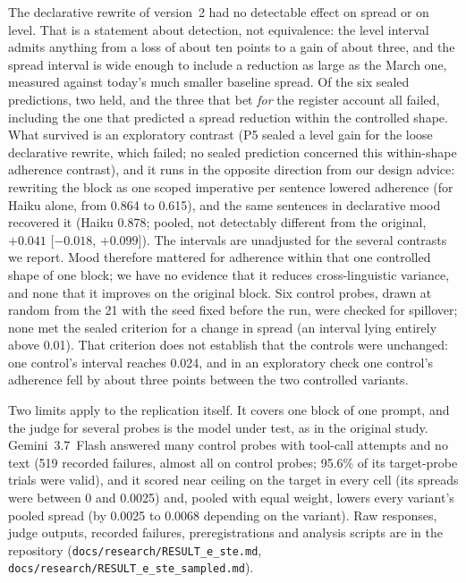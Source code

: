 \documentclass[11pt,a4paper]{article}
\begin{document}
The declarative rewrite of version~2 had no detectable effect on
spread or on level. That is a statement about detection, not
equivalence: the level interval admits anything from a loss of about
ten points to a gain of about three, and the spread interval is wide
enough to include a reduction as large as the March one, measured
against today's much smaller baseline spread. Of the six sealed
predictions, two held, and the three that bet \emph{for} the register
account all failed, including the one that predicted a spread
reduction within the controlled shape. What survived is an
exploratory contrast (P5 sealed a level gain for the loose
declarative rewrite, which failed; no sealed prediction concerned this
within-shape adherence contrast), and it runs in the opposite direction from our design
advice: rewriting the block as one scoped imperative per sentence
lowered adherence (for Haiku alone, from 0.864 to 0.615), and the same
sentences in declarative mood recovered it (Haiku 0.878; pooled, not
detectably different from the original, $+0.041$ [$-0.018$,
$+0.099$]). The intervals are unadjusted for the several contrasts we
report. Mood therefore mattered for adherence within that one
controlled shape of one block; we have no evidence that it reduces
cross-linguistic variance, and none that it improves on the original
block. Six control probes, drawn at random from the 21 with the seed
fixed before the run, were checked for spillover; none met the sealed
criterion for a change in spread (an interval lying entirely above
0.01). That criterion does not establish that the controls were
unchanged: one control's interval reaches 0.024, and in an exploratory
check one control's adherence fell by about three points between the
two controlled variants.

Two limits apply to the replication itself. It covers one block of one
prompt, and the judge for several probes is the model under test, as
in the original study. Gemini~3.7~Flash answered many control probes
with tool-call attempts and no text (519 recorded failures, almost all
on control probes; 95.6\% of its target-probe trials were valid), and
it scored near ceiling on the target in every cell (its spreads were
between 0 and 0.0025) and, pooled with equal weight, lowers every
variant's pooled spread (by 0.0025 to 0.0068 depending on the
variant).
Raw responses, judge outputs, recorded failures, preregistrations and
analysis scripts are in the repository
(\texttt{docs/research/RESULT\_e\_ste.md},
\texttt{docs/research/RESULT\_e\_ste\_sampled.md}).
\end{document}
